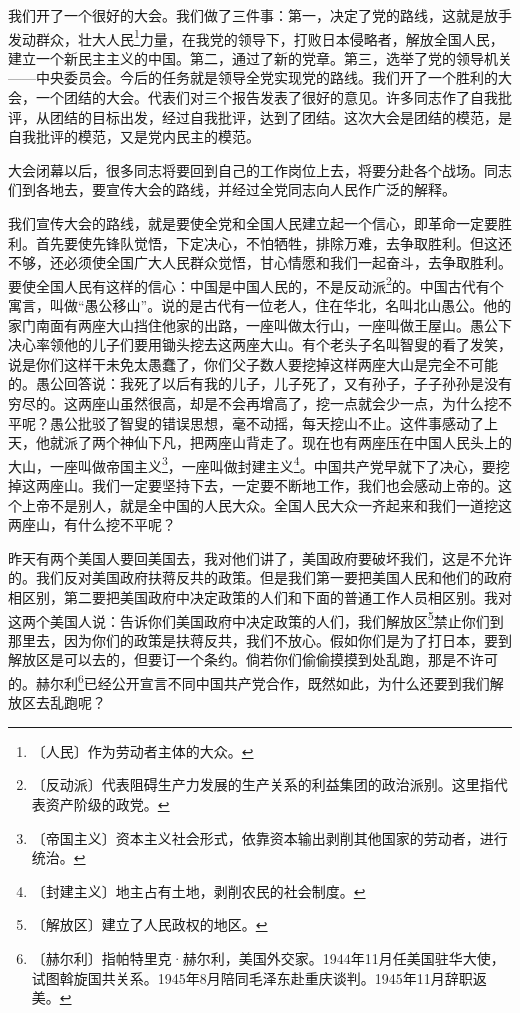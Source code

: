 \documentclass[12pt,UTF-8,openany]{ctexbook}
\begin{document}
\begin{large}
    
    我们开了一个很好的大会。我们做了三件事：第一，决定了党的路线，这就是放手发动群众，壮大人民\footnote{〔人民〕作为劳动者主体的大众。}力量，在我党的领导下，打败日本侵略者，解放全国人民，建立一个新民主主义的中国。第二，通过了新的党章。第三，选举了党的领导机关——中央委员会。今后的任务就是领导全党实现党的路线。我们开了一个胜利的大会，一个团结的大会。代表们对三个报告发表了很好的意见。许多同志作了自我批评，从团结的目标出发，经过自我批评，达到了团结。这次大会是团结的模范，是自我批评的模范，又是党内民主的模范。
    
    大会闭幕以后，很多同志将要回到自己的工作岗位上去，将要分赴各个战场。同志们到各地去，要宣传大会的路线，并经过全党同志向人民作广泛的解释。
    
    我们宣传大会的路线，就是要使全党和全国人民建立起一个信心，即革命一定要胜利。首先要使先锋队觉悟，下定决心，不怕牺牲，排除万难，去争取胜利。但这还不够，还必须使全国广大人民群众觉悟，甘心情愿和我们一起奋斗，去争取胜利。要使全国人民有这样的信心：中国是中国人民的，不是反动派\footnote{〔反动派〕代表阻碍生产力发展的生产关系的利益集团的政治派别。这里指代表资产阶级的政党。}的。中国古代有个寓言，叫做“愚公移山”。说的是古代有一位老人，住在华北，名叫北山愚公。他的家门南面有两座大山挡住他家的出路，一座叫做太行山，一座叫做王屋山。愚公下决心率领他的儿子们要用锄头挖去这两座大山。有个老头子名叫智叟的看了发笑，说是你们这样干未免太愚蠢了，你们父子数人要挖掉这样两座大山是完全不可能的。愚公回答说：我死了以后有我的儿子，儿子死了，又有孙子，子子孙孙是没有穷尽的。这两座山虽然很高，却是不会再增高了，挖一点就会少一点，为什么挖不平呢？愚公批驳了智叟的错误思想，毫不动摇，每天挖山不止。这件事感动了上天，他就派了两个神仙下凡，把两座山背走了。现在也有两座压在中国人民头上的大山，一座叫做帝国主义\footnote{〔帝国主义〕资本主义社会形式，依靠资本输出剥削其他国家的劳动者，进行统治。}，一座叫做封建主义\footnote{〔封建主义〕地主占有土地，剥削农民的社会制度。 }。中国共产党早就下了决心，要挖掉这两座山。我们一定要坚持下去，一定要不断地工作，我们也会感动上帝的。这个上帝不是别人，就是全中国的人民大众。全国人民大众一齐起来和我们一道挖这两座山，有什么挖不平呢？
    
    昨天有两个美国人要回美国去，我对他们讲了，美国政府要破坏我们，这是不允许的。我们反对美国政府扶蒋反共的政策。但是我们第一要把美国人民和他们的政府相区别，第二要把美国政府中决定政策的人们和下面的普通工作人员相区别。我对这两个美国人说：告诉你们美国政府中决定政策的人们，我们解放区\footnote{〔解放区〕建立了人民政权的地区。}禁止你们到那里去，因为你们的政策是扶蒋反共，我们不放心。假如你们是为了打日本，要到解放区是可以去的，但要订一个条约。倘若你们偷偷摸摸到处乱跑，那是不许可的。赫尔利\footnote{〔赫尔利〕指帕特里克·赫尔利，美国外交家。1944年11月任美国驻华大使，试图斡旋国共关系。1945年8月陪同毛泽东赴重庆谈判。1945年11月辞职返美。}已经公开宣言不同中国共产党合作，既然如此，为什么还要到我们解放区去乱跑呢？
    

\end{large}
\end{document}
